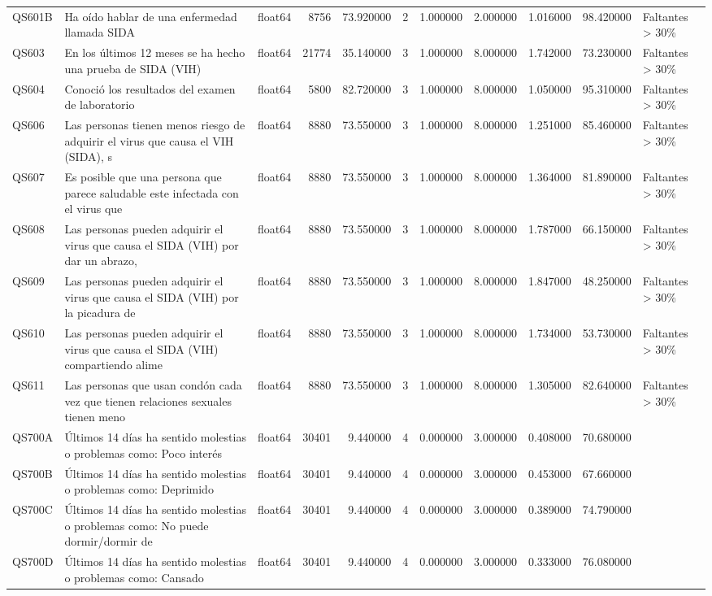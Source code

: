 \begin{longtable}{lllrrrrrrrl}
QS601B & Ha oído hablar de una enfermedad llamada SIDA & float64 & 8756 & 73.920000 & 2 & 1.000000 & 2.000000 & 1.016000 & 98.420000 & Faltantes > 30\% \\
QS603 & En los últimos 12 meses se ha hecho una prueba de SIDA (VIH) & float64 & 21774 & 35.140000 & 3 & 1.000000 & 8.000000 & 1.742000 & 73.230000 & Faltantes > 30\% \\
QS604 & Conoció los resultados del examen de laboratorio & float64 & 5800 & 82.720000 & 3 & 1.000000 & 8.000000 & 1.050000 & 95.310000 & Faltantes > 30\% \\
QS606 & Las personas tienen menos riesgo de adquirir el virus que causa el VIH (SIDA), s & float64 & 8880 & 73.550000 & 3 & 1.000000 & 8.000000 & 1.251000 & 85.460000 & Faltantes > 30\% \\
QS607 & Es posible que una persona que parece saludable este infectada con el virus que  & float64 & 8880 & 73.550000 & 3 & 1.000000 & 8.000000 & 1.364000 & 81.890000 & Faltantes > 30\% \\
QS608 & Las personas pueden adquirir el virus que causa el SIDA (VIH) por dar un abrazo, & float64 & 8880 & 73.550000 & 3 & 1.000000 & 8.000000 & 1.787000 & 66.150000 & Faltantes > 30\% \\
QS609 & Las personas pueden adquirir el virus que causa el SIDA (VIH) por la picadura de & float64 & 8880 & 73.550000 & 3 & 1.000000 & 8.000000 & 1.847000 & 48.250000 & Faltantes > 30\% \\
QS610 & Las personas pueden adquirir el virus que causa el SIDA (VIH) compartiendo alime & float64 & 8880 & 73.550000 & 3 & 1.000000 & 8.000000 & 1.734000 & 53.730000 & Faltantes > 30\% \\
QS611 & Las personas que usan condón cada vez que tienen relaciones sexuales tienen meno & float64 & 8880 & 73.550000 & 3 & 1.000000 & 8.000000 & 1.305000 & 82.640000 & Faltantes > 30\% \\
QS700A & Últimos 14 días ha sentido molestias o problemas como:  Poco interés & float64 & 30401 & 9.440000 & 4 & 0.000000 & 3.000000 & 0.408000 & 70.680000 &  \\
QS700B & Últimos 14 días ha sentido molestias o problemas como: Deprimido & float64 & 30401 & 9.440000 & 4 & 0.000000 & 3.000000 & 0.453000 & 67.660000 &  \\
QS700C & Últimos 14 días ha sentido molestias o problemas como: No puede dormir/dormir de & float64 & 30401 & 9.440000 & 4 & 0.000000 & 3.000000 & 0.389000 & 74.790000 &  \\
QS700D & Últimos 14 días ha sentido molestias o problemas como: Cansado & float64 & 30401 & 9.440000 & 4 & 0.000000 & 3.000000 & 0.333000 & 76.080000 &  \\

\end{longtable}
